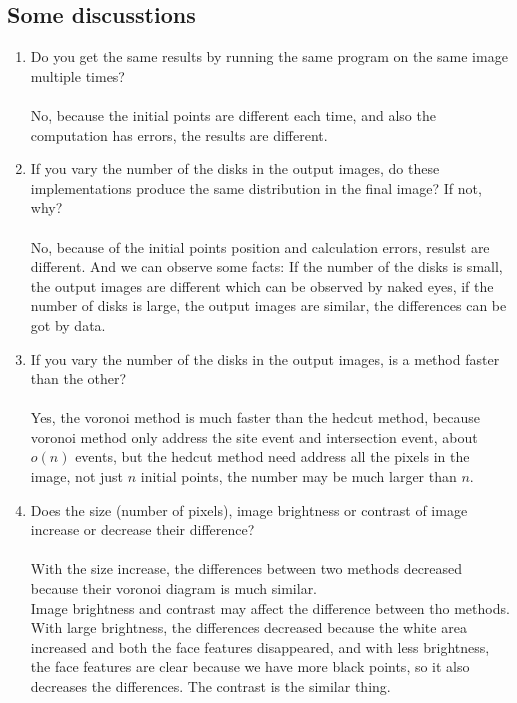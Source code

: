 \documentclass[11pt]{article}
\begin{document}
\subsection{Some discusstions}
\begin{enumerate}
\item Do you get the same results by running the same program on the same image multiple times? 
\\\\No, because the initial points are different each time, and also the computation has errors, the results are different. 

\item If you vary the number of the disks in the output images,  do these implementations produce the same distribution in the final image? If not, why?
\\\\No, because of the initial points position and calculation errors, resulst are different. And we can observe some facts: If the number of the disks is small, the output images are different which can be observed by naked eyes, if the number of disks is large, the output images are similar, the differences can be got by data. 

\item If you vary the number of the disks in the output images,  is a method faster than the other? 
\\\\Yes, the voronoi method is much faster than the hedcut method, because voronoi method only address the site event and intersection event, about $o(n)$ events, but the hedcut method need address all the pixels in the image, not just $n$ initial points, the number may be much larger than $n$. 

\item Does the size (number of pixels), image brightness or contrast of image increase or decrease their difference? 
\\\\With the size increase, the differences between two methods decreased because their voronoi diagram is much similar. 
\\ Image brightness and contrast may affect the difference between tho methods. With large brightness, the differences decreased because the white area increased and both the face features disappeared, and with less brightness, the face features are clear because we have more black points, so it also decreases the differences. The contrast is the similar thing. 



\end{enumerate}
\end{document}
